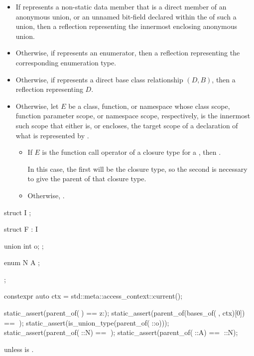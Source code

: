\begin{itemdescr}
\pnum
\returns
\begin{itemize}
\item
  If  represents a non-static data member
  that is a direct member of an anonymous union,
  or an unnamed bit-field declared
  within the  of such a union,
  then a reflection representing the innermost enclosing anonymous union.
\item
  Otherwise, if  represents an enumerator,
  then a reflection representing the corresponding enumeration type.
\item
  Otherwise, if  represents a direct base class relationship $(D, B)$,
  then a reflection representing $D$.
\item
  Otherwise, let $E$ be a class, function, or namespace
  whose class scope, function parameter scope, or namespace scope, respectively,
  is the innermost such scope that either is, or encloses,
  the target scope of a declaration of what is represented by .
  \begin{itemize}
  \item
    If $E$ is the function call operator of a closure type
    for a ,
    then .
    \begin{note}
    In this case,
    the first  will be the closure type,
    so the second  is necessary
    to give the parent of that closure type.
    \end{note}
  \item
    Otherwise, .
  \end{itemize}
\end{itemize}
\begin{example}
\begin{codeblock}
struct I { };

struct F : I {
  union {
    int o;
  };

  enum N {
    A
  };
};

constexpr auto ctx = std::meta::access_context::current();

static_assert(parent_of(^^F) == ^^::);
static_assert(parent_of(bases_of(^^F, ctx)[0]) == ^^F);
static_assert(is_union_type(parent_of(^^F::o)));
static_assert(parent_of(^^F::N) == ^^F);
static_assert(parent_of(^^F::A) == ^^F::N);
\end{codeblock}
\end{example}

\pnum
\throws
{} unless
 is .
\end{itemdescr}

